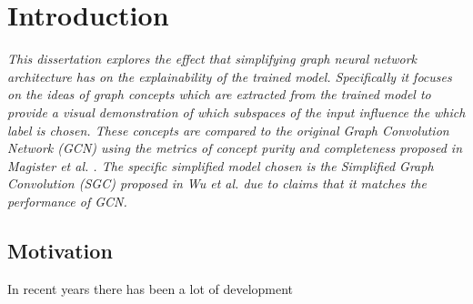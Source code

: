 \chapter{Introduction}


\emph{
This dissertation explores the effect that simplifying graph neural network architecture has on the explainability of the trained model.
Specifically it focuses on the ideas of graph concepts which are extracted from the trained model to provide a visual demonstration of which subspaces of the input influence the which label is chosen.
These concepts are compared to the original Graph Convolution Network (GCN) using the metrics of concept purity and completeness proposed in \textit{Magister et al.} \cite{magister2021gcexplainer}.
The specific simplified model chosen is the Simplified Graph Convolution (SGC) proposed in \textit{Wu et al.} \cite{wu2019simplifying} due to claims that it matches the performance of GCN.
}

\section{Motivation}





In recent years there has been a lot of development 

